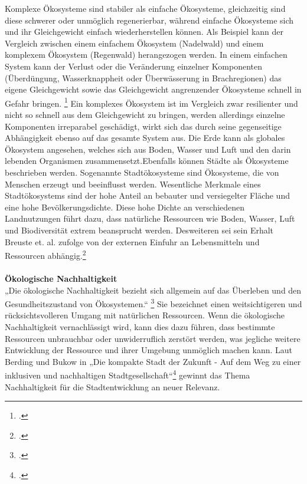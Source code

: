 \documentclass{scrartcl}
\begin{document}
\hfill \break
Komplexe Ökosysteme sind stabiler als einfache Ökosysteme, gleichzeitig sind diese schwerer oder unmöglich regenerierbar, während einfache Ökosysteme sich und ihr Gleichgewicht einfach wiederherstellen können. Als Beispiel kann der Vergleich zwischen einem einfachem Ökosystem (Nadelwald) und einem komplexem Ökosystem (Regenwald) herangezogen werden.
In einem einfachen System kann der Verlust oder die Veränderung einzelner Komponenten (Überdüngung, Wasserknappheit oder Überwässerung in Brachregionen) das eigene Gleichgewicht sowie das Gleichgewicht angrenzender Ökosysteme schnell in Gefahr bringen. \footcite{DefinitionWirtschaftslexikone} Ein komplexes Ökosystem ist im Vergleich zwar resilienter und nicht so schnell aus dem Gleichgewicht zu bringen, werden allerdings einzelne Komponenten irreparabel geschädigt, wirkt sich das durch seine gegenseitige Abhängigkeit ebenso auf das gesamte System aus.
Die Erde kann als globales Ökosystem angesehen, welches sich aus Boden, Wasser und Luft und den darin lebenden Organismen zusammensetzt.Ebenfalls können Städte als Ökosysteme beschrieben werden. Sogenannte Stadtökosysteme sind Ökosysteme, die von Menschen erzeugt und beeinflusst werden. Wesentliche Merkmale eines Stadtökosystems sind der hohe Anteil an bebauter und versiegelter Fläche und eine hohe Bevölkerungsdichte. Diese hohe Dichte an verschiedenen Landnutzungen führt dazu, dass natürliche Ressourcen wie Boden, Wasser, Luft und Biodiversität extrem beansprucht werden. Desweiteren sei sein Erhalt Breuste et. al. zufolge von der externen Einfuhr an Lebensmitteln und Ressourcen abhängig.\footcite[S.61]{Breuste2016Stadtokosysteme}
\\
\\

\textbf{Ökologische Nachhaltigkeit}\\
„Die ökologische Nachhaltigkeit bezieht sich allgemein auf das Überleben und den Gesundheitszustand von Ökosystemen.“ \footcite{DefinitionWirtschaftslexikonc} Sie bezeichnet einen weitsichtigeren und rücksichtsvolleren Umgang mit natürlichen Ressourcen. Wenn die ökologische Nachhaltigkeit vernachlässigt wird, kann dies dazu führen, dass bestimmte Ressourcen unbrauchbar oder unwiderruflich zerstört werden, was jegliche weitere Entwicklung der Ressource und ihrer Umgebung unmöglich machen kann. Laut Berding und Bukow in „Die kompakte Stadt der Zukunft - Auf dem Weg zu einer inklusiven und nachhaltigen Stadtgesellschaft“\footcite[S.95]{BerdingWolf-DietrichBukowKarinCudakHrsgDieStadtgesellschaft} gewinnt das Thema Nachhaltigkeit für die Stadtentwicklung an neuer Relevanz. 
\end{document}
